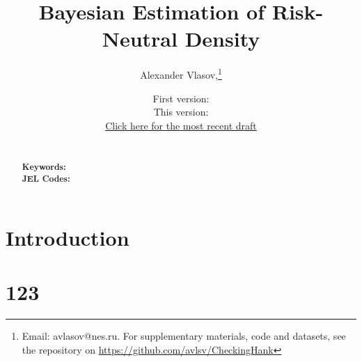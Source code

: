 \documentclass[11pt]{article}
\title{Bayesian Estimation of Risk-Neutral Density}
\author{Alexander Vlasov,\thanks{Email: avlasov@nes.ru. For supplementary materials, code and datasets, see the repository on \url{https://github.com/avlsv/CheckingHank}}}
\date{\normalsize First version: \\\vspace{1ex} This version: \\ \vspace{1ex}
\href{https://www.google.com/}{Click here for the most recent draft}}
\begin{document}
\maketitle



\begin{abstract}
    \noindent 
    \\
    \noindent\textbf{Keywords:} 
    \\
    \noindent\textbf{JEL Codes:} \\
    \bigskip
\end{abstract}

\section{Introduction}

\citet{fisherSimplexRegression2016}




\newpage


\newpage
\appendix 

\section{123}
\end{document}

